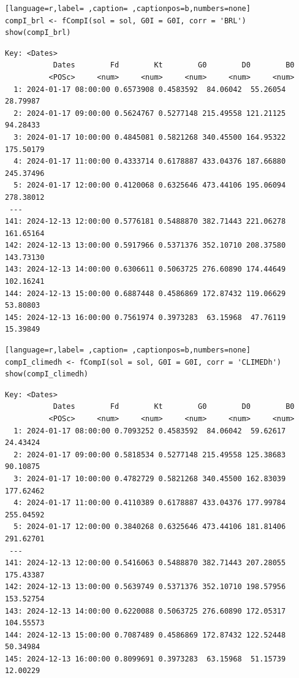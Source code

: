 \begin{itemize}
\begin{lstlisting}[language=r,label= ,caption= ,captionpos=b,numbers=none]
compI_brl <- fCompI(sol = sol, G0I = G0I, corr = 'BRL')
show(compI_brl)
\end{lstlisting}

\begin{verbatim}
Key: <Dates>
		   Dates        Fd        Kt        G0        D0        B0
		  <POSc>     <num>     <num>     <num>     <num>     <num>
  1: 2024-01-17 08:00:00 0.6573908 0.4583592  84.06042  55.26054  28.79987
  2: 2024-01-17 09:00:00 0.5624767 0.5277148 215.49558 121.21125  94.28433
  3: 2024-01-17 10:00:00 0.4845081 0.5821268 340.45500 164.95322 175.50179
  4: 2024-01-17 11:00:00 0.4333714 0.6178887 433.04376 187.66880 245.37496
  5: 2024-01-17 12:00:00 0.4120068 0.6325646 473.44106 195.06094 278.38012
 ---                                                                      
141: 2024-12-13 12:00:00 0.5776181 0.5488870 382.71443 221.06278 161.65164
142: 2024-12-13 13:00:00 0.5917966 0.5371376 352.10710 208.37580 143.73130
143: 2024-12-13 14:00:00 0.6306611 0.5063725 276.60890 174.44649 102.16241
144: 2024-12-13 15:00:00 0.6887448 0.4586869 172.87432 119.06629  53.80803
145: 2024-12-13 16:00:00 0.7561974 0.3973283  63.15968  47.76119  15.39849
\end{verbatim}

\begin{lstlisting}[language=r,label= ,caption= ,captionpos=b,numbers=none]
compI_climedh <- fCompI(sol = sol, G0I = G0I, corr = 'CLIMEDh')
show(compI_climedh)
\end{lstlisting}

\begin{verbatim}
Key: <Dates>
		   Dates        Fd        Kt        G0        D0        B0
		  <POSc>     <num>     <num>     <num>     <num>     <num>
  1: 2024-01-17 08:00:00 0.7093252 0.4583592  84.06042  59.62617  24.43424
  2: 2024-01-17 09:00:00 0.5818534 0.5277148 215.49558 125.38683  90.10875
  3: 2024-01-17 10:00:00 0.4782729 0.5821268 340.45500 162.83039 177.62462
  4: 2024-01-17 11:00:00 0.4110389 0.6178887 433.04376 177.99784 255.04592
  5: 2024-01-17 12:00:00 0.3840268 0.6325646 473.44106 181.81406 291.62701
 ---                                                                      
141: 2024-12-13 12:00:00 0.5416063 0.5488870 382.71443 207.28055 175.43387
142: 2024-12-13 13:00:00 0.5639749 0.5371376 352.10710 198.57956 153.52754
143: 2024-12-13 14:00:00 0.6220088 0.5063725 276.60890 172.05317 104.55573
144: 2024-12-13 15:00:00 0.7087489 0.4586869 172.87432 122.52448  50.34984
145: 2024-12-13 16:00:00 0.8099691 0.3973283  63.15968  51.15739  12.00229
\end{verbatim}


\end{itemize}
